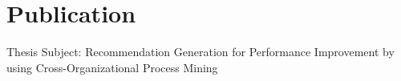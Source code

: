 \section{Publication}
\sectionspace %
Thesis Subject: Recommendation Generation for Performance Improvement by using Cross-Organizational Process Mining

\sectionspace %
